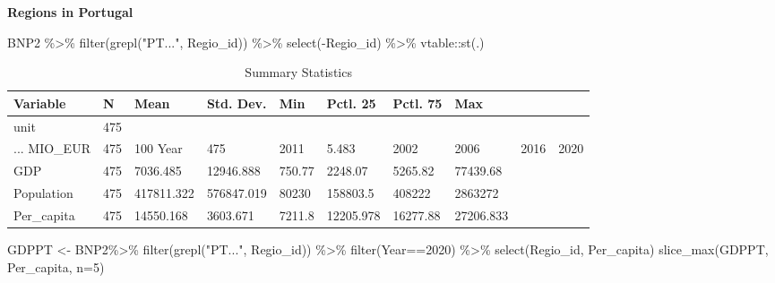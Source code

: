 \documentclass[
]{article}
\newenvironment{Shaded}{\begin{snugshade}}{\end{snugshade}}
\newcommand{\AttributeTok}[1]{\textcolor[rgb]{0.77,0.63,0.00}{#1}}
\newcommand{\DecValTok}[1]{\textcolor[rgb]{0.00,0.00,0.81}{#1}}
\newcommand{\FunctionTok}[1]{\textcolor[rgb]{0.00,0.00,0.00}{#1}}
\newcommand{\NormalTok}[1]{#1}
\newcommand{\OtherTok}[1]{\textcolor[rgb]{0.56,0.35,0.01}{#1}}
\newcommand{\SpecialCharTok}[1]{\textcolor[rgb]{0.00,0.00,0.00}{#1}}
\newcommand{\StringTok}[1]{\textcolor[rgb]{0.31,0.60,0.02}{#1}}
\begin{document}
\textbf{Regions in Portugal}

\begin{Shaded}
\begin{Highlighting}[]
\NormalTok{BNP2 }\SpecialCharTok{\%\textgreater{}\%}
  \FunctionTok{filter}\NormalTok{(}\FunctionTok{grepl}\NormalTok{(}\StringTok{"PT..."}\NormalTok{, Regio\_id)) }\SpecialCharTok{\%\textgreater{}\%}
  \FunctionTok{select}\NormalTok{(}\SpecialCharTok{{-}}\NormalTok{Regio\_id) }\SpecialCharTok{\%\textgreater{}\%}
\NormalTok{  vtable}\SpecialCharTok{::}\FunctionTok{st}\NormalTok{(.)}
\end{Highlighting}
\end{Shaded}

\begin{table}

\caption{\label{tab:unnamed-chunk-10}Summary Statistics}
\centering
\begin{tabular}[t]{llllllll}
\toprule
Variable & N & Mean & Std. Dev. & Min & Pctl. 25 & Pctl. 75 & Max\\
\midrule
unit & 475 &  &  &  &  &  & \\
... MIO_EUR & 475 & 100%
Year & 475 & 2011 & 5.483 & 2002 & 2006 & 2016 & 2020\\
GDP & 475 & 7036.485 & 12946.888 & 750.77 & 2248.07 & 5265.82 & 77439.68\\
Population & 475 & 417811.322 & 576847.019 & 80230 & 158803.5 & 408222 & 2863272\\
\addlinespace
Per_capita & 475 & 14550.168 & 3603.671 & 7211.8 & 12205.978 & 16277.88 & 27206.833\\
\bottomrule
\end{tabular}
\end{table}

\begin{Shaded}
\begin{Highlighting}[]
\NormalTok{GDPPT }\OtherTok{\textless{}{-}}\NormalTok{ BNP2}\SpecialCharTok{\%\textgreater{}\%}
  \FunctionTok{filter}\NormalTok{(}\FunctionTok{grepl}\NormalTok{(}\StringTok{"PT..."}\NormalTok{, Regio\_id)) }\SpecialCharTok{\%\textgreater{}\%}
  \FunctionTok{filter}\NormalTok{(Year}\SpecialCharTok{==}\DecValTok{2020}\NormalTok{) }\SpecialCharTok{\%\textgreater{}\%}
  \FunctionTok{select}\NormalTok{(Regio\_id, Per\_capita)}
\FunctionTok{slice\_max}\NormalTok{(GDPPT, Per\_capita, }\AttributeTok{n=}\DecValTok{5}\NormalTok{)}
\end{Highlighting}
\end{Shaded}
\end{document}
